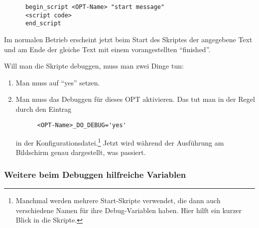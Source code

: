 \begin{example}
\begin{verbatim}
      begin_script <OPT-Name> "start message"
      <script code>
      end_script
\end{verbatim}
\end{example}

Im normalen Betrieb erscheint jetzt beim Start des Skriptes der
angegebene Text und am Ende der gleiche Text mit einem vorangestellten
"`finished"'.

Will man die Skripte debuggen, muss man zwei Dinge tun:

\begin{enumerate}

\item Man muss  auf "`yes"'
  setzen.
\item Man muss das Debuggen für dieses OPT aktivieren. Das tut man in
  der Regel durch den Eintrag
\begin{example}
\begin{verbatim}
      <OPT-Name>_DO_DEBUG='yes'
\end{verbatim}
\end{example}
in der Konfigurationsdatei.\footnote{Manchmal werden mehrere
  Start-Skripte verwendet, die dann auch verschiedene Namen für ihre
  Debug-Variablen haben. Hier hilft ein kurzer Blick in die Skripte.}
    Jetzt wird während der Ausführung am Bildschirm genau dargestellt, was
    passiert.
\end{enumerate}


\subsubsection{Weitere beim Debuggen hilfreiche Variablen}

